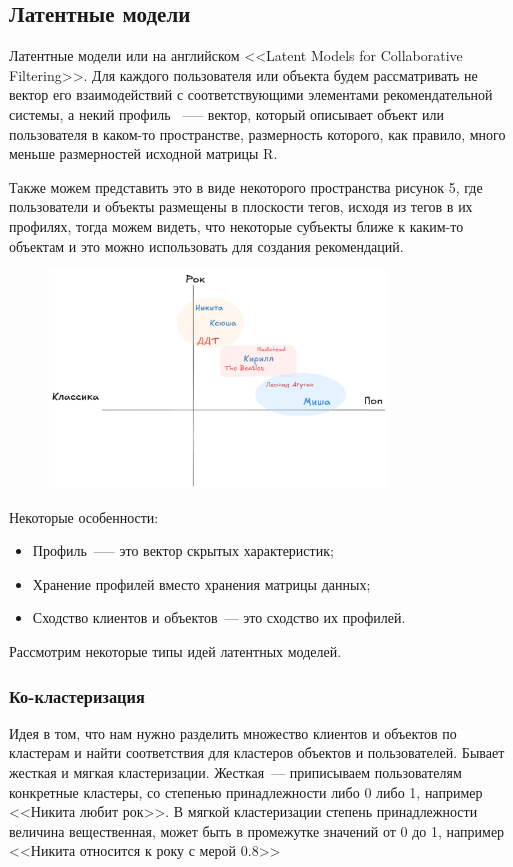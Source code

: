 \documentclass[bachelor, och, referat]{shiza}
\begin{document}
\subsection{Латентные модели}
Латентные модели или на английском <<Latent Models for Collaborative Filtering>>.
Для каждого пользователя или объекта будем рассматривать не вектор
его взаимодействий с соответствующими элементами рекомендательной системы, 
а некий профиль ~—-- вектор, который описывает объект
или пользователя в каком-то пространстве, размерность которого, как правило, 
много меньше размерностей исходной матрицы R.

Также можем представить это в виде некоторого пространства рисунок 5, где пользователи
и объекты размещены в плоскости тегов, исходя из тегов в их профилях, тогда можем видеть, что 
некоторые субъекты ближе к каким-то объектам и это можно использовать для создания рекомендаций.

\begin{figure}[H]
  \centering
  \includegraphics[width=0.8\textwidth]{./7.png}
  \caption{}
\end{figure}


Некоторые особенности:
\begin{itemize}
  \item Профиль~—-- это вектор скрытых характеристик;
  \item Хранение профилей вместо хранения матрицы данных;
  \item Сходство клиентов и объектов~--- это сходство их профилей.
\end{itemize}
Рассмотрим некоторые типы идей латентных моделей.

\subsubsection{Ко-кластеризация}
Идея в том, что нам нужно разделить множество клиентов и объектов по кластерам и найти соответствия для
кластеров объектов и пользователей.
Бывает жесткая и мягкая кластеризации. Жесткая~--- приписываем пользователям конкретные кластеры, со степенью принадлежности либо 0 либо 1, например <<Никита любит рок>>.
В мягкой кластеризации степень принадлежности величина вещественная, может быть в промежутке значений от 0 до 1, например <<Никита относится к року с мерой 0.8>>
\end{document}
